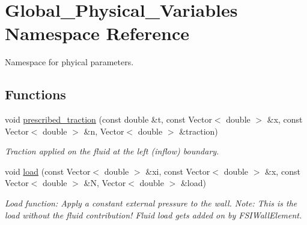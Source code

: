 \hypertarget{namespaceGlobal__Physical__Variables}{}\section{Global\+\_\+\+Physical\+\_\+\+Variables Namespace Reference}
\label{namespaceGlobal__Physical__Variables}


Namespace for phyical parameters.  


\subsection*{Functions}
\begin{DoxyCompactItemize}
\item 
void \hyperlink{namespaceGlobal__Physical__Variables_a0de42ee6d39e85c77c16a04c3a05f7a2}{prescribed\+\_\+traction} (const double \&t, const Vector$<$ double $>$ \&x, const Vector$<$ double $>$ \&n, Vector$<$ double $>$ \&traction)
\begin{DoxyCompactList}\small\item\em Traction applied on the fluid at the left (inflow) boundary. \end{DoxyCompactList}\item 
void \hyperlink{namespaceGlobal__Physical__Variables_a321267e1efb30b5d586302509354fb07}{load} (const Vector$<$ double $>$ \&xi, const Vector$<$ double $>$ \&x, const Vector$<$ double $>$ \&N, Vector$<$ double $>$ \&load)
\begin{DoxyCompactList}\small\item\em Load function\+: Apply a constant external pressure to the wall. Note\+: This is the load without the fluid contribution! Fluid load gets added on by F\+S\+I\+Wall\+Element. \end{DoxyCompactList}\end{DoxyCompactItemize}
